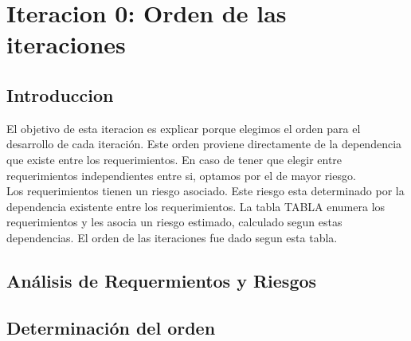 \chapter{Iteracion 0: Orden de las iteraciones} %
\label{cha:iteracion_0}

\section{Introduccion} %
\label{it0:sec:introduccion}

El objetivo de esta iteracion es explicar porque elegimos el orden para el desarrollo de cada iteración. Este orden proviene directamente de la dependencia que existe entre los requerimientos. En caso de tener que elegir entre requerimientos independientes entre si, optamos por el de mayor riesgo. \\

Los requerimientos tienen un riesgo asociado. Este riesgo esta determinado por la dependencia existente entre los requerimientos. La tabla TABLA enumera los requerimientos y les asocia un riesgo estimado, calculado segun estas dependencias. El orden de las iteraciones fue dado segun esta tabla.



\section{Análisis de Requermientos y Riesgos} %
\label{it0:sec:analisis_de_requermientos_y_riesgos}





\section{Determinación del orden} %
\label{it0:sec:determinacion_del_orden}

